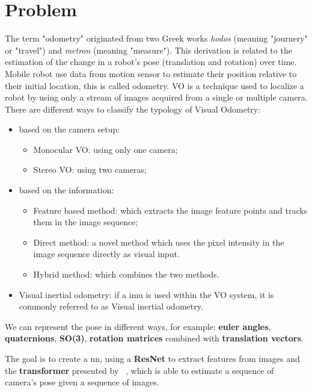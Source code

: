 \section{Problem}\label{sec:problem}
The term "odometry" originated from two Greek works \emph{hodos} (meaning "journery" or "travel") and \emph{metron} (meaning "measure").
This derivation is related to the estimation of the change in a robot's pose (translation and rotation) over time.
Mobile robot use data from motion sensor to estimate their position relative to their initial location, this is called odometry.
VO is a technique used to localize a robot by using only a stream of images acquired from a single or multiple camera.
There are different ways to classify the typology of Visual Odometry:
\begin{itemize}
    \item based on the camera setup:
        \begin{itemize}
            \item Monocular VO: using only one camera;
            \item Stereo VO: using two cameras;
        \end{itemize}
    \item based on the information:
        \begin{itemize}
            \item Feature based method: which extracts the image feature points and tracks them in the image sequence;
            \item Direct method: a novel method which uses the pixel intensity in the image sequence directly as visual input.
            \item Hybrid method: which combines the two methods.
        \end{itemize}
    \item Visual inertial odometry: if a \gls{imu} is used within the VO system, it is commonly referred to as Visual inertial odometry.
\end{itemize}
We can represent the pose in different ways, for example: \textbf{euler angles}, \textbf{quaternions}, \textbf{SO(3)}, \textbf{rotation matrices} combined with \textbf{translation vectors}.

The goal is to create a \gls{nn}, using a \textbf{ResNet} to extract features from images and the \textbf{transformer} presented by ~\cite{transformer_paper}, which is able to estimate a sequence of camera's pose given a sequence of images.